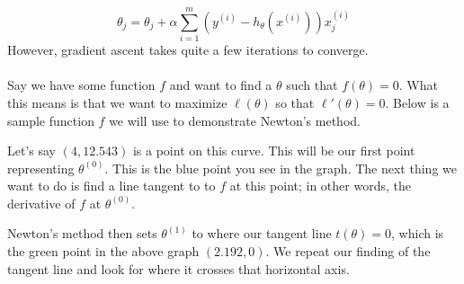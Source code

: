 \documentclass[11pt]{article}
\begin{document}
$$\theta_j = \theta_j + \alpha \sum_{i=1}^{m} \left(y^{(i)}-h_\theta\left(x^{(i)}\right)\right)x_j^{(i)}$$
However, gradient ascent takes quite a few iterations to converge. \hfill \\
\vspace{0em} \\
Say we have some function $f$ and want to find a $\theta$ such that $f(\theta) = 0$. What this means is that we want to maximize $\ell(\theta)$ so that ${\ell}'(\theta) = 0$. Below is a sample function $f$ we will use to demonstrate Newton's method.
\begin{center}
\end{center}
Let's say $(4, 12.543)$ is a point on this curve. This will be our first point representing $\theta^{(0)}$. This is the blue point you see in the graph.
\clearpage
The next thing we want to do is find a line tangent to to $f$ at this point; in other words, the derivative of $f$ at $\theta^{(0)}$.
\begin{center}
\end{center}
Newton's method then sets $\theta^{(1)}$ to where our tangent line $t(\theta) = 0$, which is the green point in the above graph $(2.192, 0)$. We repeat our finding of the tangent line and look for where it crosses that horizontal axis.
\end{document}
